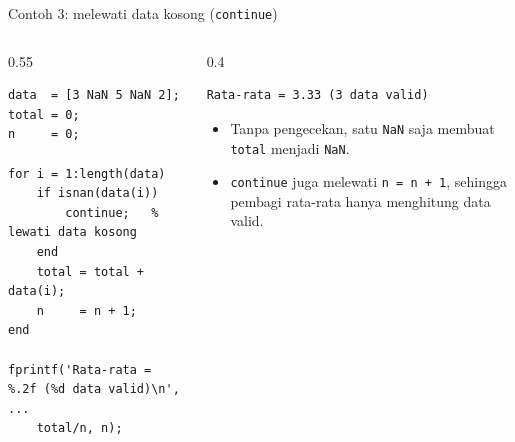 \documentclass[aspectratio=169,10pt]{beamer}
\newcommand{\codesize}{\footnotesize}
\newcommand{\kode}[1]{\texttt{#1}}
\begin{document}
\begin{frame}[fragile]{Contoh 3: melewati data kosong \hfill\small(\kode{continue})}
  \renewcommand{\codesize}{\scriptsize}
  \begin{columns}[T]
    \begin{column}{0.55\textwidth}
\begin{lstlisting}
data  = [3 NaN 5 NaN 2];
total = 0;
n     = 0;

for i = 1:length(data)
    if isnan(data(i))
        continue;   % lewati data kosong
    end
    total = total + data(i);
    n     = n + 1;
end

fprintf('Rata-rata = %.2f (%d data valid)\n', ...
    total/n, n);
\end{lstlisting}
    \end{column}
    \begin{column}{0.4\textwidth}
\begin{lstlisting}[style=out]
Rata-rata = 3.33 (3 data valid)
\end{lstlisting}
      \vspace{4pt}
      \footnotesize
      \begin{itemize}
        \item Tanpa pengecekan, satu \kode{NaN} saja membuat \kode{total} menjadi \kode{NaN}.
        \item \kode{continue} juga melewati \kode{n = n + 1}, sehingga pembagi rata-rata hanya menghitung
              data valid.
      \end{itemize}
    \end{column}
  \end{columns}
\end{frame}
\end{document}
